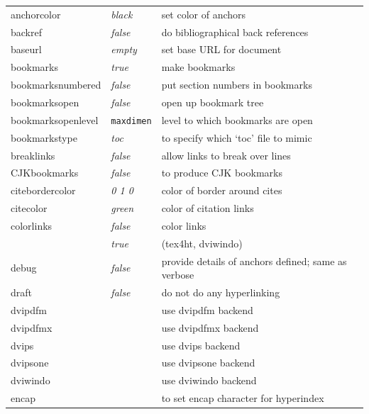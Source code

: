 \documentclass[pdftex]{article}
\newcommand{\bs}{\symbol{'134}}%
\newcommand{\ci}[1]{\texttt{\bs#1}}
\begin{document}
\noindent\begin{longtable}{@{}>{\ttfamily}llp{7cm}@{}}
anchorcolor        & \textit{black}         & set color of anchors \\
backref            & \textit{false}         & do bibliographical back references \\
baseurl            & \textit{empty}         & set base URL for document \\
bookmarks          & \textit{true}          & make bookmarks \\
bookmarksnumbered  & \textit{false}         & put section numbers in bookmarks \\
bookmarksopen      & \textit{false}         & open up bookmark tree \\
bookmarksopenlevel & \ttfamily\ci{maxdimen} & level to which bookmarks are open \\
bookmarkstype      & \textit{toc}           & to specify which `toc' file to mimic \\
breaklinks         & \textit{false}         & allow links to break over lines \\
CJKbookmarks       & \textit{false}         & to produce CJK bookmarks\\
citebordercolor    & \textit{0 1 0}         & color of border around cites \\
citecolor          & \textit{green}         & color of citation links \\
colorlinks         & \textit{false}         & color links \\
                   & \textit{true}          & (\textsf{tex4ht}, \textsf{dviwindo}) \\
debug              & \textit{false}         & provide details of anchors defined; same as verbose \\
draft              & \textit{false}         & do not do any hyperlinking \\
dvipdfm            &                        & use \textsf{dvipdfm} backend \\
dvipdfmx           &                        & use \textsf{dvipdfmx} backend \\
dvips              &                        & use \textsf{dvips} backend \\
dvipsone           &                        & use \textsf{dvipsone} backend \\
dviwindo           &                        & use \textsf{dviwindo} backend \\
encap              &                        & to set encap character for hyperindex \\

\end{longtable}
\end{document}
